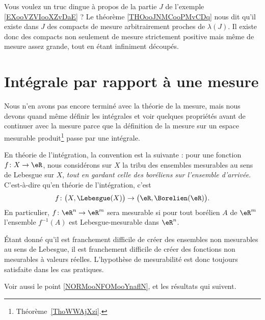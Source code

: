 Vous voulez un truc dingue à propos de la partie \( J\) de l'exemple \ref{EXooVZVIooXZvDaE} ? Le théorème \ref{THOooJNMCooPMvCDq} nous dit qu'il existe dans \( J\) des compacts de mesure arbitrairement proches de \( \lambda(J)\). Il existe donc des compacts non seulement de mesure strictement positive mais même de mesure assez grande, tout en étant infiniment découpés.

\section{Intégrale par rapport à une mesure}

\begin{normaltext}
	Nous n'en avons pas encore terminé avec la théorie de la mesure, mais nous devons quand même définir les intégrales et voir quelques propriétés avant de continuer avec la mesure parce que la définition de la mesure sur un espace mesurable produit\footnote{Théorème~\ref{ThoWWAjXzi}.} passe par une intégrale.
\end{normaltext}

\begin{normaltext}      \label{NORMooFZEDooIxSgLe}
	En théorie de l'intégration, la convention est la suivante : pour une fonction \( f\colon X\to \eR\), nous considérons sur \( X\) la tribu des ensembles mesurables au sens de Lebesgue sur \( X\), \emph{tout en gardant celle des boréliens sur l'ensemble d'arrivée}. C'est-à-dire qu'en théorie de l'intégration, c'est
	\begin{equation}
		f\colon \big( X,\Lebesgue(X) \big)\to \big( \eR,\Borelien(\eR) \big).
	\end{equation}
	En particulier, \( f\colon \eR^n\to \eR^m\) sera mesurable si pour tout borélien \( A\) de \( \eR^m\) l'ensemble \( f^{-1}(A)\) est Lebesgue-mesurable dans \( \eR^n\).

	Étant donné qu'il est franchement difficile de créer des ensembles non mesurables au sens de Lebesgue, il est franchement difficile de créer des fonctions non mesurables à valeurs réelles. L'hypothèse de mesurabilité est donc toujours satisfaite dans les cas pratiques.

	Voir aussi le point \ref{NORMooNFOMooYnaflN}, et les résultats qui suivent.
\end{normaltext}

